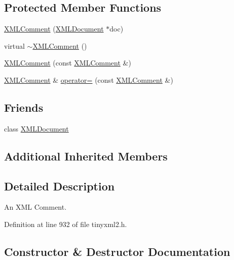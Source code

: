 \subsection*{Protected Member Functions}
\begin{DoxyCompactItemize}
\item 
\hyperlink{classtinyxml2_1_1_x_m_l_comment_ae6463adc3edd93a8e5a9b2b7e99cdf91}{X\+M\+L\+Comment} (\hyperlink{classtinyxml2_1_1_x_m_l_document}{X\+M\+L\+Document} $\ast$doc)
\item 
virtual \hyperlink{classtinyxml2_1_1_x_m_l_comment_ab592f69b47852455c1b32c5e31e453d0}{$\sim$\+X\+M\+L\+Comment} ()
\item 
\hyperlink{classtinyxml2_1_1_x_m_l_comment_aa0a9aae0850ac0e70d3cd20f6cb44447}{X\+M\+L\+Comment} (const \hyperlink{classtinyxml2_1_1_x_m_l_comment}{X\+M\+L\+Comment} \&)
\item 
\hyperlink{classtinyxml2_1_1_x_m_l_comment}{X\+M\+L\+Comment} \& \hyperlink{classtinyxml2_1_1_x_m_l_comment_ac8de55f8381d110740772e6bf6f5755a}{operator=} (const \hyperlink{classtinyxml2_1_1_x_m_l_comment}{X\+M\+L\+Comment} \&)
\end{DoxyCompactItemize}
\subsection*{Friends}
\begin{DoxyCompactItemize}
\item 
class \hyperlink{classtinyxml2_1_1_x_m_l_comment_a4eee3bda60c60a30e4e8cd4ea91c4c6e}{X\+M\+L\+Document}
\end{DoxyCompactItemize}
\subsection*{Additional Inherited Members}


\subsection{Detailed Description}
An X\+M\+L Comment. 

Definition at line 932 of file tinyxml2.\+h.



\subsection{Constructor \& Destructor Documentation}
\hypertarget{classtinyxml2_1_1_x_m_l_comment_ae6463adc3edd93a8e5a9b2b7e99cdf91}{}

